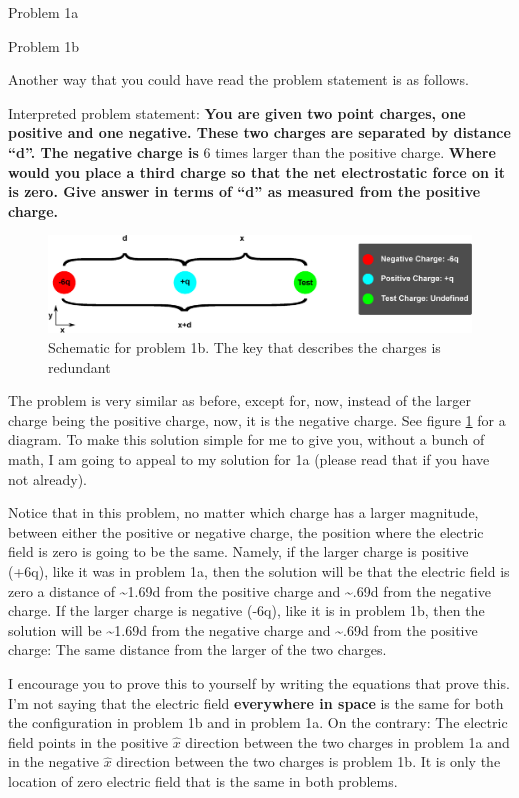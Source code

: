 \begin{homeworkProblem}
\begin{homeworkSection}{Problem 1a}
\end{homeworkSection}
\begin{homeworkSection}{Problem 1b}

Another way that you could have read the problem statement is as follows.

Interpreted problem statement: \textbf{You are given two point charges, one positive and one negative. These two charges are separated by distance ``d''. The negative charge is} 6 times larger than the positive charge. \textbf{Where would you place a third charge so that the net electrostatic force on it is zero. Give answer in terms of ``d'' as measured from the positive charge.}

\begin{figure}%
\centering
\includegraphics[width=\columnwidth]{1b.eps}%
\caption{Schematic for problem 1b. The key that describes the charges is redundant}%
\label{fig:1b.eps}%
\end{figure}

The problem is very similar as before, except for, now, instead of the larger charge being the positive charge, now, it is the negative charge. See figure \ref{fig:1b.eps} for a diagram. To make this solution simple for me to give you, without a bunch of math, I am going to appeal to my solution for 1a (please read that if you have not already). 

Notice that in this problem, no matter which charge has a larger magnitude, between either the positive or negative charge, the position where the electric field is zero is going to be the same. Namely, if the larger charge is positive (+6q), like it was in problem 1a, then the solution will be that the electric field is zero a distance of \textasciitilde1.69d from the positive charge and \textasciitilde.69d from the negative charge. If the larger charge is negative (-6q), like it is in problem 1b, then the solution will be \textasciitilde1.69d from the negative charge and \textasciitilde.69d from the positive charge: The same distance from the larger of the two charges.

I encourage you to prove this to yourself by writing the equations that prove this. I'm not saying that the electric field \textbf{everywhere in space} is the same for both the configuration in problem 1b and in problem 1a. On the contrary: The electric field points in the positive $\hat{x}$ direction between the two charges in problem 1a and in the negative $\hat{x}$ direction between the two charges is problem 1b. It is only the location of zero electric field that is the same in both problems.


\end{homeworkSection}
\end{homeworkProblem}
